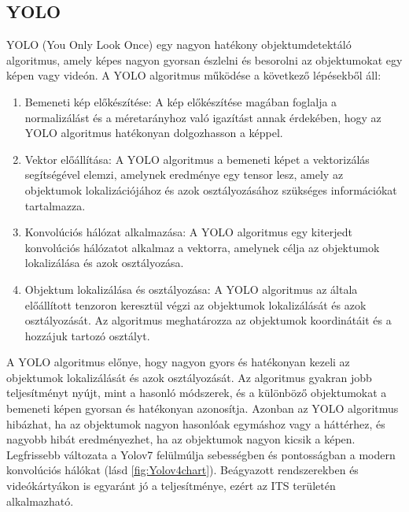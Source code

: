 \documentclass[12pt,a4paper]{article}
\begin{document}
\subsection{YOLO}
YOLO (You Only Look Once) egy nagyon hatékony objektumdetektáló algoritmus, amely képes nagyon gyorsan észlelni és besorolni az objektumokat egy képen vagy videón.
A YOLO algoritmus működése a következő lépésekből áll:
\begin{enumerate}
    \item Bemeneti kép előkészítése: A kép előkészítése magában foglalja a normalizálást és a méretarányhoz való igazítást annak érdekében, hogy az YOLO algoritmus hatékonyan dolgozhasson a képpel.
    \item Vektor előállítása: A YOLO algoritmus a bemeneti képet a vektorizálás segítségével elemzi, amelynek eredménye egy tensor lesz, amely az objektumok lokalizációjához és azok osztályozásához szükséges információkat tartalmazza.
    \item Konvolúciós hálózat alkalmazása: A YOLO algoritmus egy kiterjedt konvolúciós hálózatot alkalmaz a vektorra, amelynek célja az objektumok lokalizálása és azok osztályozása.
    \item Objektum lokalizálása és osztályozása: A YOLO algoritmus az általa előállított tenzoron keresztül végzi az objektumok lokalizálását és azok osztályozását. Az algoritmus meghatározza az objektumok koordinátáit és a hozzájuk tartozó osztályt.
\end{enumerate}
A YOLO algoritmus előnye, hogy nagyon gyors és hatékonyan kezeli az objektumok lokalizálását és azok osztályozását. Az algoritmus gyakran jobb teljesítményt nyújt, mint a hasonló módszerek, és a különböző objektumokat a bemeneti képen gyorsan és hatékonyan azonosítja. Azonban az YOLO algoritmus hibázhat, ha az objektumok nagyon hasonlóak egymáshoz vagy a háttérhez, és nagyobb hibát eredményezhet, ha az objektumok nagyon kicsik a képen.
Legfrissebb változata a Yolov7 felülmúlja sebességben és pontosságban a modern konvolúciós hálókat (lásd \ref{fig:Yolov4chart}). Beágyazott rendszerekben és videókártyákon is egyaránt jó a teljesítménye, ezért az ITS területén alkalmazható.
\end{document}
